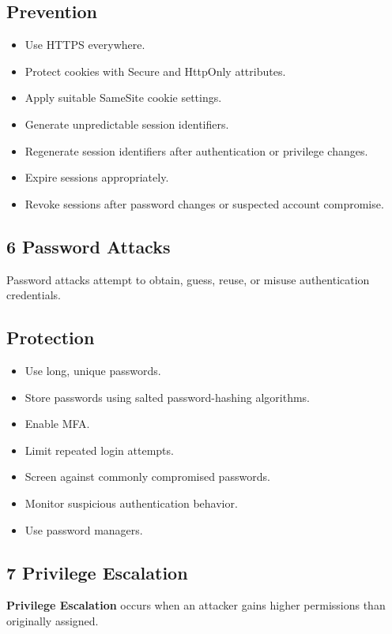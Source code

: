 \subsection{Prevention}

\begin{itemize}
\item Use HTTPS everywhere.
\item Protect cookies with Secure and HttpOnly attributes.
\item Apply suitable SameSite cookie settings.
\item Generate unpredictable session identifiers.
\item Regenerate session identifiers after authentication or privilege changes.
\item Expire sessions appropriately.
\item Revoke sessions after password changes or suspected account compromise.
\end{itemize}

\subsection{6 Password Attacks}

Password attacks attempt to obtain, guess, reuse, or misuse authentication credentials.


\subsection{Protection}

\begin{itemize}
\item Use long, unique passwords.
\item Store passwords using salted password-hashing algorithms.
\item Enable MFA.
\item Limit repeated login attempts.
\item Screen against commonly compromised passwords.
\item Monitor suspicious authentication behavior.
\item Use password managers.
\end{itemize}

\subsection{7 Privilege Escalation}

\textbf{Privilege Escalation} occurs when an attacker gains higher permissions than originally assigned.

